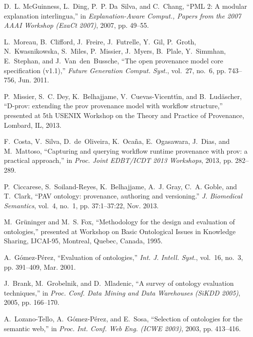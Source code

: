\begin{singlespace}
\begin{thebibliography}{10}
	D.~L. McGuinness, L.~Ding, P.~P. Da~Silva, and C.~Chang, ``{PML} 2: A modular
	explanation interlingua,'' in \emph{Explanation-Aware Comput., Papers from
		the 2007 {AAAI} Workshop ({ExaCt} 2007)}, 2007, pp. 49--55.
	
	L.~Moreau, B.~Clifford, J.~Freire, J.~Futrelle, Y.~Gil, P.~Groth,
	N.~Kwasnikowska, S.~Miles, P.~Missier, J.~Myers, B.~Plale, Y.~Simmhan, E.~Stephan, and J.~Van~den~Bussche, ``The open
	provenance model core specification (v1.1),'' \emph{Future Generation Comput.
		Syst.}, vol.~27, no.~6, pp. 743--756, Jun. 2011.
	
	P.~Missier, S.~C. Dey, K.~Belhajjame, V.~Cuevas-Vicentt{\'\i}n, and
	B.~Lud{\"a}scher, ``D-prov: extending the prov provenance model with workflow
	structure,'' presented at {5th USENIX Workshop on the Theory and Practice of
		Provenance, {Lombard, IL}, 2013}.
	
	F.~Costa, V.~Silva, D.~de~Oliveira, K.~Oca{\~n}a, E.~Ogasawara, J.~Dias, and
	M.~Mattoso, ``Capturing and querying workflow runtime provenance with prov: a
	practical approach,'' in \emph{Proc. Joint EDBT/ICDT 2013 Workshops}, 2013,
	pp. 282--289.
	
	P.~Ciccarese, S.~Soiland-Reyes, K.~Belhajjame, A.~J. Gray, C.~A. Goble, and
	T.~Clark, ``{PAV} ontology: provenance, authoring and versioning.'' \emph{J.
		Biomedical Semantics}, vol.~4, no.~1, pp. 37:1--37:22, Nov. 2013.
	
	M.~Gr{\"u}ninger and M.~S. Fox, ``Methodology for the design and evaluation of
	ontologies,'' presented at Workshop on Basic Ontological Issues in Knowledge
	Sharing, {IJCAI}-95, {Montreal, Quebec, Canada}, 1995.
	
	A.~G{\'o}mez-P{\'e}rez, ``Evaluation of ontologies,'' \emph{Int. J. Intell.
		Syst.}, vol.~16, no.~3, pp. 391--409, Mar. 2001.
	
	J.~Brank, M.~Grobelnik, and D.~Mladenic, ``A survey of ontology evaluation
	techniques,'' in \emph{Proc. Conf. Data Mining and Data Warehouses ({SiKDD}
		2005)}, 2005, pp. 166--170.
	
	A.~Lozano-Tello, A.~G{\'o}mez-P{\'e}rez, and E.~Sosa, ``Selection of ontologies
	for the semantic web,'' in \emph{Proc. Int. Conf. Web Eng. ({ICWE} 2003)},
	2003, pp. 413--416.
	

\end{thebibliography}
\end{singlespace}
